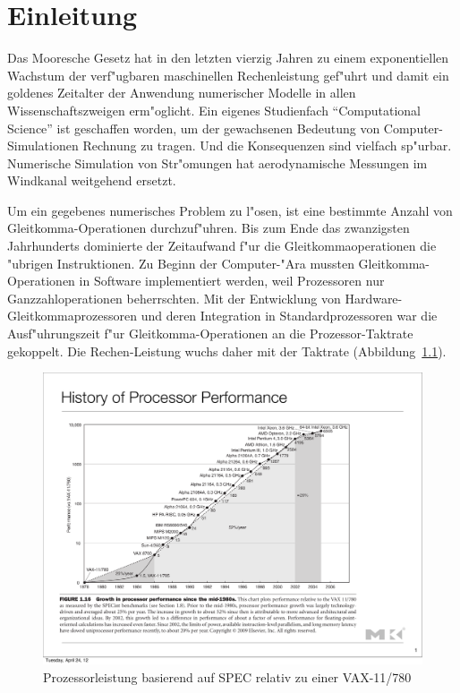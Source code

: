 \chapter{Einleitung}
Das Mooresche Gesetz hat in den letzten vierzig Jahren zu einem
exponentiellen Wachstum der verf"ugbaren maschinellen Rechenleistung
gef"uhrt und damit ein goldenes Zeitalter der Anwendung numerischer
Modelle in allen Wissenschaftszweigen erm"oglicht.
Ein eigenes Studienfach ``Computational Science'' ist geschaffen worden,
um der gewachsenen Bedeutung von Computer-Simulationen Rechnung zu
tragen. Und die Konsequenzen sind vielfach sp"urbar.
Numerische Simulation von Str"omungen hat aerodynamische Messungen
im Windkanal weitgehend ersetzt.

Um ein gegebenes numerisches Problem zu l"osen, ist eine bestimmte
Anzahl von Gleit\-komma-Operationen durchzuf"uhren.
Bis zum Ende das zwanzigsten Jahrhunderts dominierte der Zeitaufwand f"ur
die Gleitkommaoperationen die "ubrigen Instruktionen.
Zu Beginn der Computer-"Ara mussten Gleitkomma-Operationen in Software
implementiert werden, weil Prozessoren nur Ganzzahloperationen 
beherrschten. Mit der Entwicklung von Hardware-Gleitkommaprozessoren
und deren Integration in Standardprozessoren war die Ausf"uhrungszeit
f"ur Gleitkomma-Operationen an die Prozessor-Taktrate gekoppelt.
Die Rechen-Leistung wuchs daher mit der Taktrate
(Abbildung~\ref{processorperformance}).
\begin{figure}
\begin{center}
\includegraphics[width=\hsize]{images/processorperformance.pdf}
\end{center}
\caption{Prozessorleistung basierend auf SPEC relativ zu einer VAX-11/780}
\label{processorperformance}
\end{figure}

